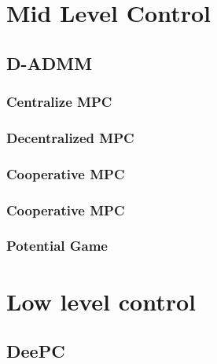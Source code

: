 










\section{Mid Level Control}
\subsection{D-ADMM}

\subsubsection{Centralize MPC}

\subsubsection{Decentralized MPC}

\subsubsection{Cooperative MPC}

\subsubsection{Cooperative MPC}

\subsubsection{Potential Game}


\section{Low level control}

\subsection{DeePC}




